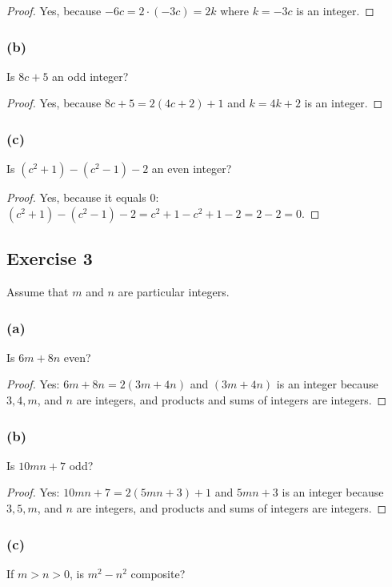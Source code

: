 \documentclass[14pt]{extarticle}
\begin{document}
\begin{proof}
    Yes, because $-6c = 2 \cdot (-3c) = 2k$ where $k = -3c$ is an integer.
\end{proof}

\subsubsection{(b)}
Is $8c + 5$ an odd integer?

\begin{proof}
    Yes, because $8c + 5 = 2(4c + 2) + 1$ and $k = 4k+2$ is an integer.
\end{proof}

\subsubsection{(c)}
Is $(c^2 + 1) - (c^2 - 1) - 2$ an even integer?

\begin{proof}
    Yes, because it equals 0: $(c^2 + 1) - (c^2 - 1) - 2 = c^2 + 1 - c^2 + 1 - 2 = 2 - 2 = 0$.
\end{proof}

\subsection{Exercise 3}
Assume that $m$ and $n$ are particular integers.

\subsubsection{(a)}
Is $6m + 8n$ even?

\begin{proof}
    Yes: $6m + 8n = 2(3m + 4n)$ and $(3m + 4n)$ is an integer because $3, 4, m$, and $n$ are integers, and products and sums of integers are integers.
\end{proof}

\subsubsection{(b)}
Is $10mn + 7$ odd?

\begin{proof}
    Yes: $10mn + 7 = 2(5mn + 3) + 1$ and $5mn + 3$ is an integer because $3, 5, m$, and $n$ are integers, and products and sums of integers are integers.
\end{proof}

\subsubsection{(c)}
If $m > n > 0$, is $m^2 - n^2$ composite?
\end{document}
